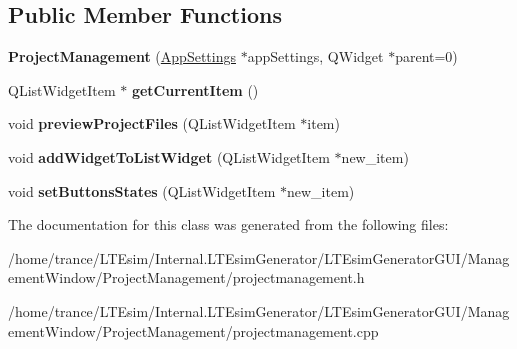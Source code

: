 \subsection*{Public Member Functions}
\begin{DoxyCompactItemize}
\item 
{\bfseries Project\+Management} (\hyperlink{class_app_settings}{App\+Settings} $\ast$app\+Settings, Q\+Widget $\ast$parent=0)\hypertarget{class_project_management_a53eb8698ea04bb7bd8da99aead7b5821}{}\label{class_project_management_a53eb8698ea04bb7bd8da99aead7b5821}

\item 
Q\+List\+Widget\+Item $\ast$ {\bfseries get\+Current\+Item} ()\hypertarget{class_project_management_ac551e249e28dcc971af0d3d07ada2285}{}\label{class_project_management_ac551e249e28dcc971af0d3d07ada2285}

\item 
void {\bfseries preview\+Project\+Files} (Q\+List\+Widget\+Item $\ast$item)\hypertarget{class_project_management_a374defd8e75adf805d6eb097907daa97}{}\label{class_project_management_a374defd8e75adf805d6eb097907daa97}

\item 
void {\bfseries add\+Widget\+To\+List\+Widget} (Q\+List\+Widget\+Item $\ast$new\+\_\+item)\hypertarget{class_project_management_a8a99fc979f495cf8a00b0849a9a29e90}{}\label{class_project_management_a8a99fc979f495cf8a00b0849a9a29e90}

\item 
void {\bfseries set\+Buttons\+States} (Q\+List\+Widget\+Item $\ast$new\+\_\+item)\hypertarget{class_project_management_a95e5e077d093813b6ca98eaf80d0d6a5}{}\label{class_project_management_a95e5e077d093813b6ca98eaf80d0d6a5}

\end{DoxyCompactItemize}


The documentation for this class was generated from the following files\+:\begin{DoxyCompactItemize}
\item 
/home/trance/\+L\+T\+Esim/\+Internal.\+L\+T\+Esim\+Generator/\+L\+T\+Esim\+Generator\+G\+U\+I/\+Management\+Window/\+Project\+Management/projectmanagement.\+h\item 
/home/trance/\+L\+T\+Esim/\+Internal.\+L\+T\+Esim\+Generator/\+L\+T\+Esim\+Generator\+G\+U\+I/\+Management\+Window/\+Project\+Management/projectmanagement.\+cpp\end{DoxyCompactItemize}
